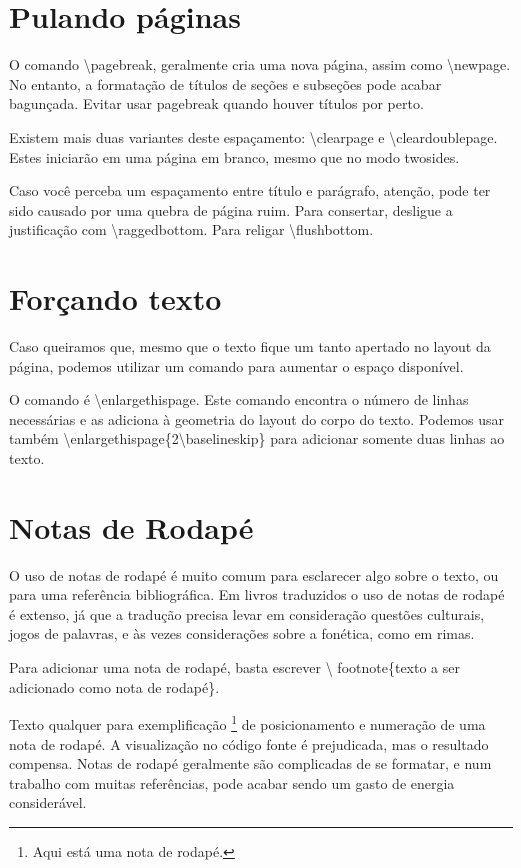 \section[Pulando páginas]{Pulando páginas}
O comando \textbackslash pagebreak, geralmente cria uma nova página,
assim como \textbackslash newpage.
No entanto, a formatação de títulos de seções e subseções pode acabar bagunçada.
Evitar usar pagebreak quando houver títulos por perto.

Existem mais duas variantes deste espaçamento: 
\textbackslash clearpage e \textbackslash cleardoublepage.
Estes iniciarão em uma página em branco, mesmo que no modo twosides.

Caso você perceba um espaçamento entre título e parágrafo,
atenção, pode ter sido causado por uma quebra de página ruim.
Para consertar, desligue a justificação com \textbackslash raggedbottom.
Para religar \textbackslash flushbottom.

\section{Forçando texto}
Caso queiramos que, mesmo que o texto fique um tanto apertado no layout da
página, podemos utilizar um comando para aumentar o espaço disponível.

O comando é \textbackslash enlargethispage.  Este comando encontra o número de
linhas necessárias e as adiciona à geometria do layout do corpo do texto.
Podemos usar também \textbackslash enlargethispage\{2\textbackslash baselineskip\} para
adicionar somente duas linhas ao texto.

\section{Notas de Rodapé}
O uso de notas de rodapé é muito comum para esclarecer algo sobre o texto, ou
para uma referência bibliográfica. Em livros traduzidos o uso de notas de
rodapé é extenso, já que a tradução precisa levar em consideração questões
culturais, jogos de palavras, e às vezes considerações sobre a fonética, como
em rimas.

Para adicionar uma nota de rodapé, basta escrever \textbackslash
footnote\{texto a ser adicionado como nota de rodapé\}.

Texto qualquer para exemplificação \footnote{Aqui está uma nota de rodapé.} de
posicionamento e numeração de uma nota de rodapé. A visualização no código
fonte é prejudicada, mas o resultado compensa. Notas de rodapé geralmente são
complicadas de se formatar, e num trabalho com muitas referências, pode acabar
sendo um gasto de energia considerável.

